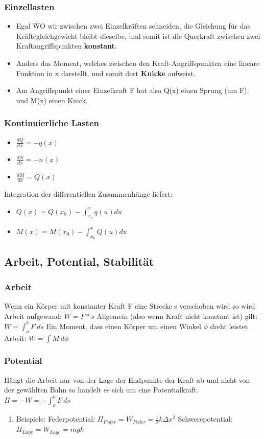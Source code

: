\documentclass[11pt]{article}
\begin{document}
\subsubsection{Einzellasten}
\label{sec:org51b3a3c}
\begin{itemize}
\item Egal WO wir zwischen zwei Einzelkräften schneiden, die Gleichung für das Kräftegleichgewicht bleibt dieselbe, und somit ist die Querkraft zwischen zwei Kraftangriffspunkten \textbf{konstant}.
\item Anders das Moment, welches zwischen den Kraft-Angriffspunkten eine lineare Funktion in x darstellt, und somit dort \textbf{Knicke} aufweist.
\item Am Angriffspunkt einer Einzelkraft F hat also Q(x) einen Sprung (um F), und M(x) einen Knick.
\end{itemize}
\subsubsection{Kontinuierliche Lasten}
\label{sec:org17a14f8}
\begin{itemize}
\item \(\frac{dQ}{dx} = -q(x)\)
\item \(\frac{dN}{dx} = -n(x)\)
\item \(\frac{dM}{dx} = Q(x)\)
\end{itemize}
Integration der differentiellen Zusammenhänge liefert:
\begin{itemize}
\item \(Q(x) = Q(x_0) - \int_{x_0}^{x} q(u) du\)
\item \(M(x) = M(x_0) - \int_{x_0}^{x} Q(u) du\)
\end{itemize}

\subsection{Arbeit, Potential, Stabilität}
\label{sec:orgf3868ea}

\subsubsection{Arbeit}
\label{sec:orgb488236}
Wenn ein Körper mit konstanter Kraft F eine Strecke s verschoben wird so wird Arbeit aufgewand: \(W = F*s\)
Allgemein (also wenn Kraft nicht konstant ist) gilt: \(W = \int_a^b F \ ds\)
Ein Moment, dass einen Körper um einen Winkel \(\phi\) dreht leistet Arbeit: \(W = \int M \ d\phi\)
\subsubsection{Potential}
\label{sec:org917bf01}
Hängt die Arbeit nur von der Lage der Endpunkte der Kraft ab und nicht von der gewählten Bahn so handelt es sich um eine Potentialkraft.
\(\Pi = -W = -\int_a^b F \ ds\)
\begin{enumerate}
\item Beispiele:
\label{sec:orgf220848}
Federpotential: \(\Pi_{Feder} = W_{Feder} = \frac{1}{2} k \Delta x^2\)
Schwerepotential: \(\Pi_{Lage} = W_{Lage} = mgh\)
\end{enumerate}
\end{document}
